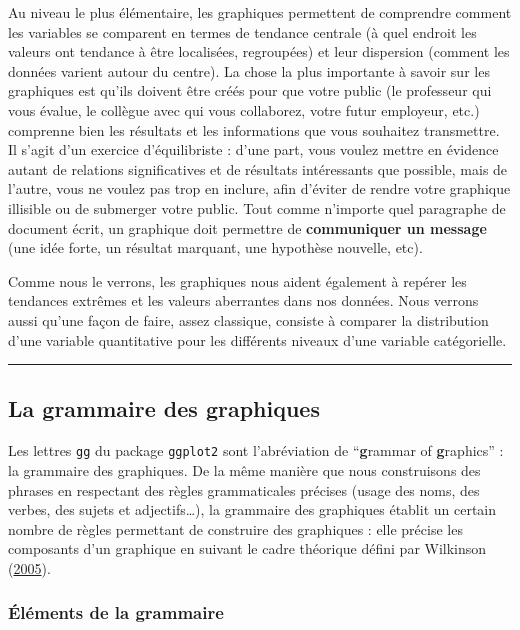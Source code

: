 \documentclass[
  a4paper,
]{article}
\begin{document}
Au niveau le plus élémentaire, les graphiques permettent de comprendre comment les variables se comparent en termes de tendance centrale (à quel endroit les valeurs ont tendance à être localisées, regroupées) et leur dispersion (comment les données varient autour du centre). La chose la plus importante à savoir sur les graphiques est qu'ils doivent être créés pour que votre public (le professeur qui vous évalue, le collègue avec qui vous collaborez, votre futur employeur, etc.) comprenne bien les résultats et les informations que vous souhaitez transmettre. Il s'agit d'un exercice d'équilibriste : d'une part, vous voulez mettre en évidence autant de relations significatives et de résultats intéressants que possible, mais de l'autre, vous ne voulez pas trop en inclure, afin d'éviter de rendre votre graphique illisible ou de submerger votre public. Tout comme n'importe quel paragraphe de document écrit, un graphique doit permettre de \textbf{communiquer un message} (une idée forte, un résultat marquant, une hypothèse nouvelle, etc).

Comme nous le verrons, les graphiques nous aident également à repérer les tendances extrêmes et les valeurs aberrantes dans nos données. Nous verrons aussi qu'une façon de faire, assez classique, consiste à comparer la distribution d'une variable quantitative pour les différents niveaux d'une variable catégorielle.

\begin{center}\rule{0.5\linewidth}{0.5pt}\end{center}

\hypertarget{gggraph}{%
\subsection{La grammaire des graphiques}\label{gggraph}}

Les lettres \texttt{gg} du package \texttt{ggplot2} sont l'abréviation de ``\textbf{g}rammar of \textbf{g}raphics'' : la grammaire des graphiques. De la même manière que nous construisons des phrases en respectant des règles grammaticales précises (usage des noms, des verbes, des sujets et adjectifs\ldots), la grammaire des graphiques établit un certain nombre de règles permettant de construire des graphiques : elle précise les composants d'un graphique en suivant le cadre théorique défini par Wilkinson (\protect\hyperlink{ref-wilkinson2005}{2005}).

\hypertarget{uxe9luxe9ments-de-la-grammaire}{%
\subsubsection{Éléments de la grammaire}\label{uxe9luxe9ments-de-la-grammaire}}
\end{document}
